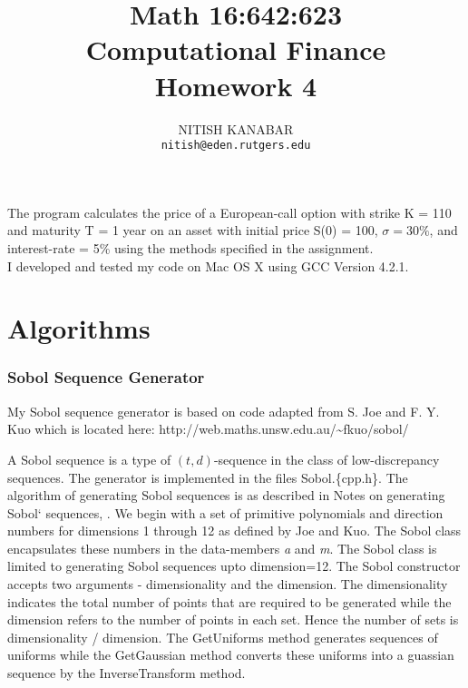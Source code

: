 \documentclass[letterpaper,twoside,11pt,fleqn]{article}
\begin{document}

\title{Math 16:642:623 \\Computational Finance \\ Homework 4}
\author{NITISH KANABAR \\ \texttt{nitish@eden.rutgers.edu}}

\maketitle

\thispagestyle{empty} 

\clearpage
\vfill
\pagebreak


\setcounter{page}{1}


The program calculates the price of a European-call option with strike K = 110 and maturity T = 1 year on an asset with initial price S(0) = 100, \(\sigma = 30\%\), and interest-rate = 5\% using the methods specified in the assignment. \\

I developed and tested my code on Mac OS X using GCC Version 4.2.1.

\section*{Algorithms}

\subsubsection*{Sobol Sequence Generator}
My Sobol sequence generator is based on code adapted from S. Joe and F. Y. Kuo which is located here: http://web.maths.unsw.edu.au/\textasciitilde{}fkuo/sobol/

A Sobol sequence is a type of \( (t, d) \)-sequence in the class of low-discrepancy sequences.  The generator is implemented in the files Sobol.\{cpp.h\}.  The algorithm of generating Sobol sequences is as described in Notes on generating Sobol` sequences, \cite{joe_kuo}.  We begin with a set of primitive polynomials and direction numbers for dimensions 1 through 12 as defined by Joe and Kuo. The Sobol class encapsulates these numbers in the data-members {\em a} and {\em m}.  The Sobol class is limited to generating Sobol sequences upto dimension=12.  The Sobol constructor accepts two arguments - dimensionality and the dimension. The dimensionality indicates the total number of points that are required to be generated while the dimension refers to the number of points in each set. Hence the number of sets is dimensionality / dimension.   The GetUniforms method generates sequences of uniforms while the GetGaussian method converts these uniforms into a guassian sequence by the InverseTransform method.
\end{document}
